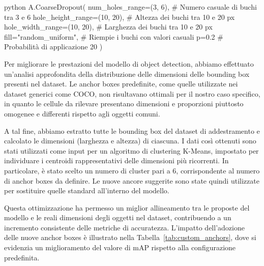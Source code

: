\documentclass[minted, draw]{../tex/hebdomon}
\begin{document}
\begin{code}{python}
A.CoarseDropout(
    num_holes_range=(3, 6),              # Numero casuale di buchi tra 3 e 6
    hole_height_range=(10, 20),          # Altezza dei buchi tra 10 e 20 px
    hole_width_range=(10, 20),           # Larghezza dei buchi tra 10 e 20 px
    fill="random_uniform",               # Riempie i buchi con valori casuali
    p=0.2                               # Probabilità di applicazione 20%
)
\end{code}



Per migliorare le prestazioni del modello di object detection, abbiamo effettuato un’analisi approfondita della distribuzione delle dimensioni delle bounding box presenti nel dataset. Le anchor boxes predefinite, come quelle utilizzate nei dataset generici come COCO, non risultavano ottimali per il nostro caso specifico, in quanto le cellule da rilevare presentano dimensioni e proporzioni piuttosto omogenee e differenti rispetto agli oggetti comuni.

A tal fine, abbiamo estratto tutte le bounding box del dataset di addestramento e calcolato le dimensioni (larghezza e altezza) di ciascuna. I dati così ottenuti sono stati utilizzati come input per un algoritmo di clustering K-Means, impostato per individuare i centroidi rappresentativi delle dimensioni più ricorrenti. In particolare, è stato scelto un numero di cluster pari a 6, corrispondente al numero di anchor boxes da definire. Le nuove ancore suggerite sono state quindi utilizzate per sostituire quelle standard all’interno del modello.

Questa ottimizzazione ha permesso un miglior allineamento tra le proposte del modello e le reali dimensioni degli oggetti nel dataset, contribuendo a un incremento consistente delle metriche di accuratezza. L'impatto dell’adozione delle nuove anchor boxes è illustrato nella Tabella~\ref{tab:custom_anchors}, dove si evidenzia un miglioramento del valore di mAP rispetto alla configurazione predefinita.

\end{document}
